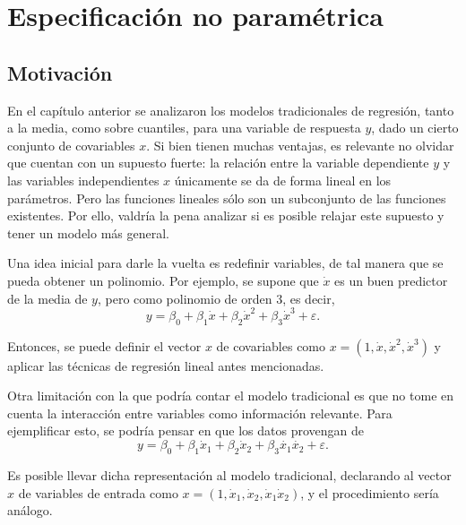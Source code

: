 \chapter[Especificaci\'on no param\'etrica]{Especificaci\'on no param\'etrica}

\section{Motivaci\'on}

En el cap\'itulo anterior se analizaron los modelos tradicionales de regresi\'on, tanto a la media, como sobre cuantiles, para una variable de respuesta $y$, dado un cierto conjunto de covariables $x$. Si bien tienen muchas ventajas, es relevante no olvidar que cuentan con un supuesto fuerte: la relación entre la variable dependiente $y$ y las variables independientes $x$ \'unicamente se da de forma lineal en los par\'ametros. Pero las funciones lineales s\'olo son un subconjunto de las funciones existentes. Por ello, valdr\'ia la pena analizar si es posible relajar este supuesto y tener un modelo m\'as general.

Una idea inicial para darle la vuelta es redefinir variables, de tal manera que se pueda obtener un polinomio. Por ejemplo, se supone que $\dot{x}$ es un buen predictor de la media de $y$, pero como polinomio de orden 3, es decir,
\begin{equation*}
    y = \beta_0 + \beta_1\dot{x} + \beta_2\dot{x}^2 + \beta_3\dot{x}^3 + \varepsilon.
\end{equation*}

Entonces, se puede definir el vector $x$ de covariables como $x = (1,\dot{x},\dot{x}^2,\dot{x}^3)$ y aplicar las t\'ecnicas de regresi\'on lineal antes mencionadas.

Otra limitaci\'on con la que podr\'ia contar el modelo tradicional es que no tome en cuenta la interacci\'on entre variables como informaci\'on relevante. Para ejemplificar esto, se podr\'ia pensar en que los datos provengan de
\begin{equation*}
    y = \beta_0 + \beta_1\dot{x}_1 + \beta_2\dot{x}_2 + \beta_3\dot{x_1}\dot{x_2} + \varepsilon.
\end{equation*}

Es posible llevar dicha representaci\'on al modelo tradicional, declarando al vector $x$ de variables de entrada como $x = (1,\dot{x}_1,\dot{x}_2,\dot{x}_1\dot{x}_2)$, y el procedimiento ser\'ia an\'alogo.

